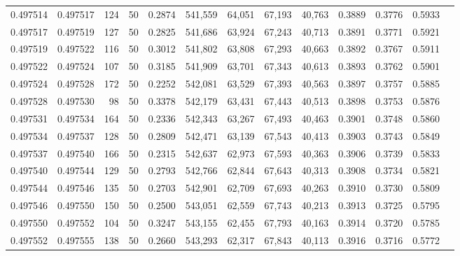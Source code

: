 \begin{tabular}{rrrrrrrrrrrrr}
0.497514 & 0.497517 &   124 &  50 &                                     0.2874 & 541,559 &  64,051 &  67,193 &  40,763 & 0.3889 & 0.3776 & 0.5933 \\
0.497517 & 0.497519 &   127 &  50 &                                     0.2825 & 541,686 &  63,924 &  67,243 &  40,713 & 0.3891 & 0.3771 & 0.5921 \\
0.497519 & 0.497522 &   116 &  50 &                                     0.3012 & 541,802 &  63,808 &  67,293 &  40,663 & 0.3892 & 0.3767 & 0.5911 \\
0.497522 & 0.497524 &   107 &  50 &                                     0.3185 & 541,909 &  63,701 &  67,343 &  40,613 & 0.3893 & 0.3762 & 0.5901 \\
0.497524 & 0.497528 &   172 &  50 &                                     0.2252 & 542,081 &  63,529 &  67,393 &  40,563 & 0.3897 & 0.3757 & 0.5885 \\
0.497528 & 0.497530 &    98 &  50 &                                     0.3378 & 542,179 &  63,431 &  67,443 &  40,513 & 0.3898 & 0.3753 & 0.5876 \\
0.497531 & 0.497534 &   164 &  50 &                                     0.2336 & 542,343 &  63,267 &  67,493 &  40,463 & 0.3901 & 0.3748 & 0.5860 \\
0.497534 & 0.497537 &   128 &  50 &                                     0.2809 & 542,471 &  63,139 &  67,543 &  40,413 & 0.3903 & 0.3743 & 0.5849 \\
0.497537 & 0.497540 &   166 &  50 &                                     0.2315 & 542,637 &  62,973 &  67,593 &  40,363 & 0.3906 & 0.3739 & 0.5833 \\
0.497540 & 0.497544 &   129 &  50 &                                     0.2793 & 542,766 &  62,844 &  67,643 &  40,313 & 0.3908 & 0.3734 & 0.5821 \\
0.497544 & 0.497546 &   135 &  50 &                                     0.2703 & 542,901 &  62,709 &  67,693 &  40,263 & 0.3910 & 0.3730 & 0.5809 \\
0.497546 & 0.497550 &   150 &  50 &                                     0.2500 & 543,051 &  62,559 &  67,743 &  40,213 & 0.3913 & 0.3725 & 0.5795 \\
0.497550 & 0.497552 &   104 &  50 &                                     0.3247 & 543,155 &  62,455 &  67,793 &  40,163 & 0.3914 & 0.3720 & 0.5785 \\
0.497552 & 0.497555 &   138 &  50 &                                     0.2660 & 543,293 &  62,317 &  67,843 &  40,113 & 0.3916 & 0.3716 & 0.5772 \\

\end{tabular}
